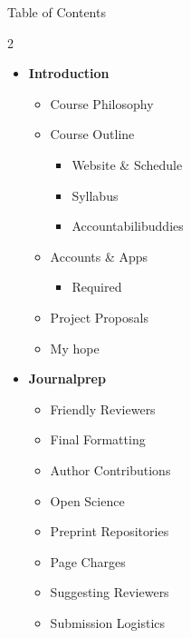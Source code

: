 \documentclass{beamer}
\begin{document}
\begin{frame}{Table of Contents}
  \begin{multicols}{2}
    \small  %

    \begin{itemize}[leftmargin=0pt, label={}, itemsep=0.6em]

      \item \textbf{\large Introduction}
      \begin{itemize}[leftmargin=1.2em, label={$\bullet$}, itemsep=0.15em]
        \item Course Philosophy
        \item Course Outline
          \begin{itemize}[leftmargin=1.2em, label={--}, itemsep=0.1em]
            \item Website \& Schedule
            \item Syllabus
            \item Accountabilibuddies
          \end{itemize}
        \item Accounts \& Apps
          \begin{itemize}[leftmargin=1.2em, label={--}, itemsep=0.1em]
            \item Required
          \end{itemize}
        \item Project Proposals
        \item My hope
      \end{itemize}

    \end{itemize}

    \columnbreak

    \begin{itemize}[leftmargin=0pt, label={}, itemsep=0.6em]

      \item \textbf{\large Journalprep}
      \begin{itemize}[leftmargin=1.2em, label={$\bullet$}, itemsep=0.15em]
        \item Friendly Reviewers
        \item Final Formatting
        \item Author Contributions
        \item Open Science
        \item Preprint Repositories
        \item Page Charges
        \item Suggesting Reviewers
        \item Submission Logistics
      \end{itemize}

    \end{itemize}
  \end{multicols}
\end{frame}
\end{document}
